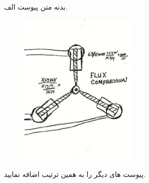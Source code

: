 \begin{appendices}


\chapter{}

بدنه متن پیوست الف.

\begin{figure}[!ht]
\centering
\includegraphics[width=0.5\textwidth]{figs/flux_sketch.jpg}
\label{appx: Flux Sketch}
\end{figure}

پیوست های دیگر را به همین ترتیب اضافه نمایید.

\end{appendices}